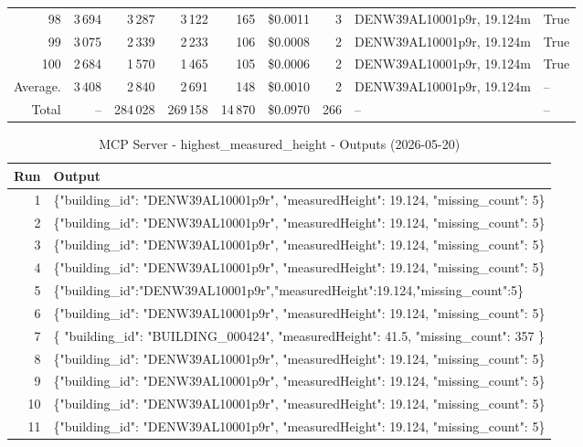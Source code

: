 \documentclass[a4paper,11pt]{article}
\begin{document}
\begin{table}[ht]
\begin{tabular}{r r r r r r r p{3cm} l}
98 & 3\,694 & 3\,287 & 3\,122 & 165 & \$0.0011 & 3 & DENW39AL10001p9r, 19.124m & True \\
99 & 3\,075 & 2\,339 & 2\,233 & 106 & \$0.0008 & 2 & DENW39AL10001p9r, 19.124m & True \\
100 & 2\,684 & 1\,570 & 1\,465 & 105 & \$0.0006 & 2 & DENW39AL10001p9r, 19.124m & True \\
\hline
Average. & 3\,408 & 2\,840 & 2\,691 & 148 & \$0.0010 & 2 & DENW39AL10001p9r, 19.124m & -- \\
Total & -- & 284\,028 & 269\,158 & 14\,870 & \$0.0970 & 266 & -- & -- \\
\hline
\end{tabular}
\end{table}

\clearpage

\begin{table}[ht]
\centering
\scriptsize
\caption{MCP Server - highest\_measured\_height - Outputs (2026-05-20)}
\label{tab:mcp\_highest\_measured\_height\_outputs\_2026-05-20}
\begin{tabular}{r p{12cm}}
\hline
Run & Output \\
\hline
1 & \{"building\_id": "DENW39AL10001p9r", "measuredHeight": 19.124, "missing\_count": 5\} \\
2 & \{"building\_id": "DENW39AL10001p9r", "measuredHeight": 19.124, "missing\_count": 5\} \\
3 & \{"building\_id": "DENW39AL10001p9r", "measuredHeight": 19.124, "missing\_count": 5\} \\
4 & \{"building\_id": "DENW39AL10001p9r", "measuredHeight": 19.124, "missing\_count": 5\} \\
5 & \{"building\_id":"DENW39AL10001p9r","measuredHeight":19.124,"missing\_count":5\} \\
6 & \{"building\_id": "DENW39AL10001p9r", "measuredHeight": 19.124, "missing\_count": 5\} \\
7 & \{
  "building\_id": "BUILDING\_000424",
  "measuredHeight": 41.5,
  "missing\_count": 357
\} \\
8 & \{"building\_id": "DENW39AL10001p9r", "measuredHeight": 19.124, "missing\_count": 5\} \\
9 & \{"building\_id": "DENW39AL10001p9r", "measuredHeight": 19.124, "missing\_count": 5\} \\
10 & \{"building\_id": "DENW39AL10001p9r", "measuredHeight": 19.124, "missing\_count": 5\} \\
11 & \{"building\_id": "DENW39AL10001p9r", "measuredHeight": 19.124, "missing\_count": 5\} \\

\end{tabular}
\end{table}
\end{document}
